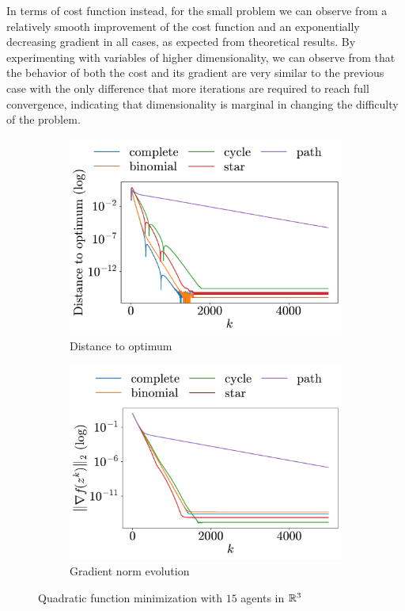 \documentclass[a4paper,11pt,oneside]{book}
\begin{document}
In terms of cost function instead, for the small problem we can observe from  a relatively smooth improvement of the cost function and an exponentially decreasing gradient in all cases, as expected from theoretical results. By experimenting with variables of higher dimensionality, we can observe from  that the behavior of both the cost and its gradient are very similar to the previous case with the only difference that more iterations are required to reach full convergence, indicating that dimensionality is marginal in changing the difficulty of the problem. 


\begin{figure}[h!]
      \centering
      \begin{subfigure}[h]{0.42\linewidth}
            \centering
            \includegraphics[width=\linewidth]{./figs/quadratic/15_3/distance.pdf} 
            \caption{Distance to optimum}
      \end{subfigure}
      \hfill
      \begin{subfigure}[h]{0.42\linewidth}
            \centering
            \includegraphics[width=\linewidth]{./figs/quadratic/15_3/gradient.pdf} 
            \caption{Gradient norm evolution}
      \end{subfigure}
      \caption{Quadratic function minimization with $15$ agents in ${\mathbb{R}}^{3}$}
      \label{fig:quadratic_15_3}
\end{figure}
\end{document}
